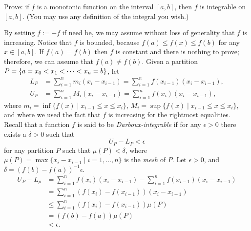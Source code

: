 \begin{problem}
Prove: if $f$ is a monotonic function on the interval $[a,b]$, then $f$ is integrable on $[a,b]$. (You may use any definition of the integral you wish.)
\begin{solution}
By setting $f := -f$ if need be, we may assume without loss of generality that $f$ is increasing. Notice that $f$ is bounded, because $f(a) \leq f(x) \leq f(b)$ for any $x \in [a,b]$. If $f(a) = f(b)$ then $f$ is constant and there is nothing to prove; therefore, we can assume that $f(a) \neq f(b)$. Given a partition $P = \left\{ a = x_0 < x_1 < \cdots < x_n = b\right\}$, let
\begin{align*}
    L_P &= \sum_{i=1}^n m_i (x_i - x_{i-1}) = \sum_{i=1}^n f(x_{i-1}) (x_i - x_{i-1}), \\
    U_P &= \sum_{i=1}^n M_i (x_i - x_{i-1}) = \sum_{i=1}^n f(x_i) (x_i - x_{i-1}),
\end{align*}
where $m_i = \inf\{f(x) \mid x_{i-1} \leq x \leq x_i\}$, $M_i = \sup\{f(x) \mid x_{i-1} \leq x \leq x_i\}$, and where we used the fact that $f$ is increasing for the rightmost equalities.
Recall that a function $f$ is said to be \emph{Darboux-integrable} if for any $\epsilon > 0$ there exists a $\delta > 0$ such that
$$ U_P - L_P < \epsilon $$
for any partition $P$ such that $\mu(P) < \delta$, where $\mu(P) = \max\{x_i - x_{i-1} \mid i = 1, \ldots, n\}$ is the \emph{mesh} of $P$. Let $\epsilon > 0$, and $\delta = (f(b) - f(a))^{-1} \epsilon$.
\begin{align*}
    U_P - L_p &= \sum_{i=1}^n f(x_i) (x_i - x_{i-1}) - \sum_{i=1}^n f(x_{i-1}) (x_i - x_{i-1}) \\
    &= \sum_{i=1}^n (f(x_i) - f(x_{i-1})) (x_i - x_{i-1}) \\
    &\leq \sum_{i=1}^n (f(x_i) - f(x_{i-1})) \mu(P) \\
    &= (f(b) - f(a)) \mu(P) \\
    &< \epsilon.
\end{align*}
\end{solution}
\end{problem}

